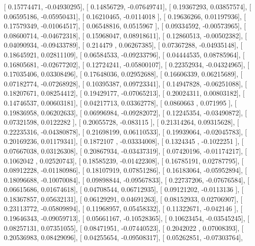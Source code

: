 \documentclass{article}
\begin{document}
       [ 0.15774471, -0.04930295],
       [ 0.14856729, -0.07649741],
       [ 0.19367293,  0.03857574],
       [ 0.06595186, -0.05950431],
       [ 0.16210465, -0.0114018 ],
       [ 0.19636266,  0.01197936],
       [ 0.17579349, -0.01064517],
       [ 0.06548816,  0.0515967 ],
       [ 0.09334592, -0.00573965],
       [ 0.08600714, -0.04672318],
       [ 0.15968047,  0.08918611],
       [ 0.12860513, -0.00502382],
       [ 0.04090934, -0.09433789],
       [ 0.214479  ,  0.06267385],
       [ 0.07367288, -0.04935148],
       [ 0.18645921,  0.02811109],
       [ 0.06584533, -0.09233796],
       [ 0.04444535,  0.08785964],
       [ 0.16805681, -0.02677202],
       [ 0.12724241, -0.05800107],
       [ 0.22352934, -0.04324965],
       [ 0.17035406,  0.03308496],
       [ 0.17648036,  0.02952688],
       [ 0.16606339,  0.06215689],
       [ 0.07182774, -0.07268928],
       [ 0.10395387,  0.09723341],
       [ 0.14947828, -0.06251088],
       [ 0.18207671,  0.08254412],
       [ 0.19429177, -0.07065213],
       [ 0.20024311,  0.00803182],
       [ 0.14746537,  0.00603181],
       [ 0.04217713,  0.03362778],
       [ 0.0860663 ,  0.071995  ],
       [ 0.19836958,  0.06202633],
       [ 0.06996984, -0.09282072],
       [ 0.12245354, -0.03490872],
       [ 0.07321598,  0.0122282 ],
       [ 0.20055728, -0.083115  ],
       [ 0.21314264,  0.09315628],
       [ 0.22235316, -0.04380878],
       [ 0.21698199,  0.06110533],
       [ 0.19939064, -0.02045783],
       [ 0.20169236,  0.01179341],
       [ 0.1872107 , -0.03334008],
       [ 0.1324345 , -0.1022251 ],
       [ 0.07667038,  0.03126308],
       [ 0.20867934, -0.03437319],
       [ 0.07420196, -0.01174217],
       [ 0.1062042 ,  0.02520743],
       [ 0.18585239, -0.01422308],
       [ 0.16785191,  0.02787795],
       [ 0.08912228, -0.01180986],
       [ 0.18107919,  0.07851286],
       [ 0.16183064, -0.05952894],
       [ 0.18096688, -0.10070084],
       [ 0.09898844, -0.09567833],
       [ 0.22737206, -0.07676584],
       [ 0.06615686,  0.01674618],
       [ 0.04708544,  0.06712935],
       [ 0.09121202, -0.0113136 ],
       [ 0.18367857,  0.05632131],
       [ 0.06129291,  0.04691263],
       [ 0.08152933,  0.02706907],
       [ 0.23113772, -0.05809894],
       [ 0.11968957,  0.05458332],
       [ 0.11322671, -0.042146  ],
       [ 0.19646343, -0.09059713],
       [ 0.05661167, -0.10528365],
       [ 0.10623454, -0.03545245],
       [ 0.08257131,  0.07351055],
       [ 0.08471951, -0.07440523],
       [ 0.2042022 ,  0.07008393],
       [ 0.20536983,  0.08429096],
       [ 0.04255654, -0.09508317],
       [ 0.05262851, -0.07303764],
\end{document}
